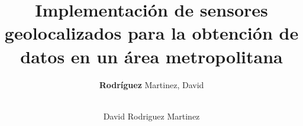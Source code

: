 \documentclass[a4, nocrop, rm, castellano]{editorialupv}
\title{
	Implementación de sensores geolocalizados para la obtención de datos en un área metropolitana
	\\[3ex]
	\mdseries\large
	}
\author{
	\textbf{Rodríguez} Martinez, David\\
	\\[2.5cm]
 \incluyeGrafico[width=0.4\textwidth]{UPV_horitzontal}
}
\author{David Rodriguez Martinez}
\begin{document}

\ifcastellano %
	\renewcommand{\itemautorefname}{punto}
	\renewcommand{\sectionautorefname}{sección}
	\renewcommand{\subsectionautorefname}{subsección}
	\renewcommand{\subsubsectionautorefname}{subsección}
	\renewcommand{\figureautorefname}{figura}
	\renewcommand{\tableautorefname}{tabla}
	
	\renewcommand{\indexname}{Índice alfabético}
	\renewcommand{\bibname}{Bibliografía}
	\renewcommand{\contentsname}{Índice general}
	\renewcommand{\abstractname}{Resumen}
\fi

\ifvalencia %
	\renewcommand{\itemautorefname}{punt}
	\renewcommand{\sectionautorefname}{secció}
	\renewcommand{\subsectionautorefname}{subsecció}
	\renewcommand{\subsubsectionautorefname}{subsecció}
	\renewcommand{\figureautorefname}{figura}
	\renewcommand{\tableautorefname}{taula}

	\renewcommand{\indexname}{Índex alfabètic}
	\renewcommand{\bibname}{Bibliografia}
	\renewcommand{\contentsname}{Índex}
	\renewcommand{\abstractname}{Resum}	
\fi


\frontmatter


\maketitle	




\ifEPUB
\else

	\tableofcontents
	\listoffigures
\fi

\end{document}
